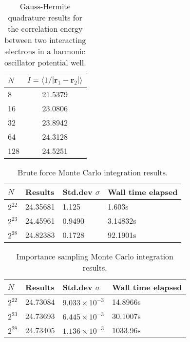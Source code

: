 \documentclass[a4paper,11pt]{article}
\begin{document}
\begin{table}
    \centering
    \caption{Gauss-Hermite quadrature results for the correlation energy between two interacting electrons in a harmonic oscillator potential well.}
    \begin{tabular}{l c}
        \hline
        $N$ &   $I = \langle 1/|\mathbf{r}_1 - \mathbf{r}_2| \rangle$ \\
        \hline
        8   &   21.5379 \\
        16  &   23.0806 \\
        32  &   23.8942 \\
        64  &   24.3128 \\
        128 &   24.5251 \\
        \hline
    \end{tabular}
    \label{tab:2_gauhermite}
\end{table}

\begin{table}
    \centering
    \caption{Brute force Monte Carlo integration results.}
    \begin{tabular}{l l l l}
        \hline
        $N$         &   Results     & Std.dev $\sigma$  & Wall time elapsed  \\
        \hline
        $2^{22}$    & 24.35681  & 1.125   & 1.603s \\
        $2^{23}$    & 24.45961  & 0.9490  & 3.14832s \\
        $2^{28}$    & 24.82383  & 0.1728  & 92.1901s \\
        \hline
    \end{tabular}
    \label{tab:4_MC-brute}
\end{table}
\begin{table}
    \centering
    \caption{Importance sampling Monte Carlo integration results.}
    \begin{tabular}{l l l l}
        \hline
        $N$         &   Results     & Std.dev $\sigma$ & Wall time elapsed  \\
        \hline
        $2^{22}$    & 24.73084 & $9.033 \times 10^{-3}$ & 14.8966s \\
        $2^{23}$    & 24.73693 & $6.445 \times 10^{-3}$  & 30.1007s \\
        $2^{28}$    & 24.73405  & $1.136 \times 10^{-3}$  & 1033.96s \\
        \hline
    \end{tabular}
    \label{tab:5_MC-importance}
\end{table}
\end{document}
